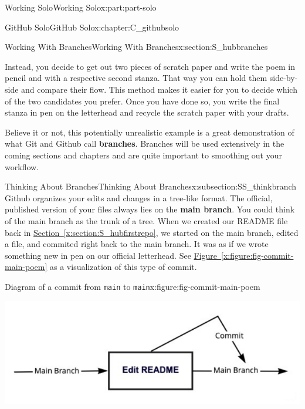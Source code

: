 \documentclass[oneside,10pt,]{book}
\newcommand{\xreffont}{\relax}
\newcommand{\mono}[1]{\texttt{#1}}
\newcommand{\terminology}[1]{\textbf{#1}}
\begin{document}
\begin{partptx}{Working Solo}{}{Working Solo}{}{}{x:part:part-solo}
\begin{chapterptx}{GitHub Solo}{}{GitHub Solo}{}{}{x:chapter:C_githubsolo}
\begin{sectionptx}{Working With Branches}{}{Working With Branches}{}{}{x:section:S_hubbranches}
\begin{introduction}{}
\par
Instead, you decide to get out two pieces of scratch paper and write the poem in pencil and with a respective second stanza. That way you can hold them side-by-side and compare their flow. This method makes it easier for you to decide which of the two candidates you prefer. Once you have done so, you write the final stanza in pen on the letterhead and recycle the scratch paper with your drafts.%
\par
Believe it or not, this potentially unrealistic example is a great demonstration of what Git and Github call \terminology{branches}. Branches will be used extensively in the coming sections and chapters and are quite important to smoothing out your workflow.%
\end{introduction}%
%
%
\typeout{************************************************}
\typeout{************************************************}
%
\begin{subsectionptx}{Thinking About Branches}{}{Thinking About Branches}{}{}{x:subsection:SS_thinkbranch}
%
%
Github organizes your edits and changes in a tree-like format. The official, published version of your files always lies on the \terminology{main branch}. You could think of the main branch as the trunk of a tree. When we created our README file back in \hyperref[x:section:S_hubfirstrepo]{Section~{\xreffont\ref{x:section:S_hubfirstrepo}}}, we started on the main branch, edited a file, and commited right back to the main branch. It was as if we wrote something new in pen on our official letterhead. See \hyperref[x:figure:fig-commit-main-poem]{Figure~{\xreffont\ref{x:figure:fig-commit-main-poem}}} as a visualization of this type of commit.%
\begin{figureptx}{Diagram of a commit from \mono{main} to \mono{main}}{x:figure:fig-commit-main-poem}{}%
\begin{image}{0.05}{0.9}{0.05}%
\includegraphics[width=\linewidth]{external/commit_main_poem.pdf}
\end{image}%

\end{figureptx}
\end{subsectionptx}
\end{sectionptx}
\end{chapterptx}
\end{partptx}
\end{document}
